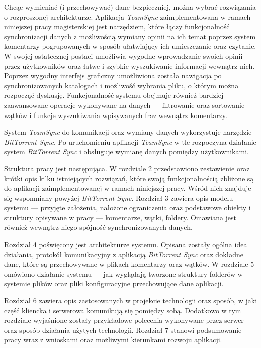 \documentclass[polish,a4paper,twoside]{ppfcmthesis}
\begin{document}
Chcąc wymieniać (i przechowywać) dane bezpieczniej, można wybrać rozwiązania o rozproszonej architekturze. Aplikacja \emph{TeamSync} zaimplementowana w ramach niniejszej pracy magisterskiej jest narzędziem, które łączy funkcjonalność synchronizacji danych z możliwością wymiany opinii na ich temat poprzez system komentarzy pogrupowanych w sposób ułatwiający ich umieszczanie oraz czytanie. W swojej ostatecznej postaci umożliwia wygodne wprowadzanie swoich opinii przez użytkowników oraz łatwe i szybkie wyszukiwanie informacji wewnątrz nich. Poprzez wygodny interfejs graficzny umożliwiona została nawigacja po synchronizowanych katalogach i możliwość wybrania pliku, o którym można rozpocząć dyskusję. Funkcjonalność systemu obejmuje również bardziej zaawansowane operacje wykonywane na danych --- filtrowanie oraz sortowanie wątków i funkcje wyszukiwania wpisywanych fraz wewnątrz komentarzy.

System \emph{TeamSync} do komunikacji oraz wymiany danych wykorzystuje narzędzie \emph{BitTorrent Sync}. Po uruchomieniu aplikacji \emph{TeamSync} w tle rozpoczyna działanie system \emph{BitTorrent Sync} i obsługuje wymianę danych pomiędzy użytkownikami.

Struktura pracy jest następująca. W rozdziale 2 przedstawiono zestawienie oraz krótki opis kilku istniejących rozwiązań, które swoją funkcjonalnością zbliżone są do aplikacji zaimplementowanej w ramach niniejszej pracy. Wśród nich znajduje się wspomniany powyżej \emph{BitTorrent Sync}. Rozdział 3 zawiera opis modelu systemu --- przyjęte założenia, nałożone ograniczenia oraz podstawowe obiekty i struktury opisywane w pracy --- komentarze, wątki, foldery. Omawiana jest również wewnątrz niego spójność synchronizowanych danych.

Rozdział 4 poświęcony jest architekturze systemu. Opisana zostały ogólna idea działania, protokół komunikacyjny z aplikacją \emph{BitTorrent Sync} oraz dokładne dane, które są przechowywane w plikach komentarzy oraz wątków. W rozdziale 5 omówiono działanie systemu --- jak wyglądają tworzone struktury folderów w systemie plików oraz pliki konfiguracyjne przechowujące dane aplikacji.

Rozdział 6 zawiera opis zastosowanych w projekcie technologii oraz sposób, w jaki część kliencka i serwerowa komunikują się pomiędzy sobą. Dodatkowo w tym rozdziale wyjaśnione zostały przykładowe polecenia wykonywane przez serwer oraz sposób działania użytych technologii. Rozdział 7 stanowi podsumowanie pracy wraz z wnioskami oraz możliwymi kierunkami rozwoju aplikacji.
\end{document}
